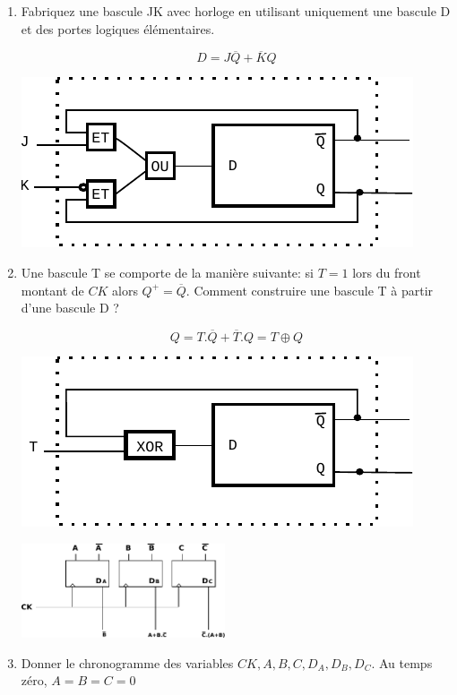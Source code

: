 \documentclass[a4paper,10pt]{exam}
\begin{document}
\begin{enumerate}
  \item Fabriquez une bascule JK avec horloge en utilisant uniquement une
    bascule D et des portes logiques élémentaires.
    \begin{solution}
      $$ D = J\overline{Q} + \overline{K}Q$$

      \includegraphics{TD8-JK}
    \end{solution}

  \item Une bascule T se comporte de la manière suivante: si $T = 1$ lors du
    front montant de $CK$ alors $Q^{+} = \overline{Q}$. Comment construire
    une bascule T à partir d'une bascule D ?

    \begin{solution}
      $$ Q = T.\overline{Q} + \overline{T}.Q = T \oplus Q $$

      \includegraphics{TD8-T}
    \end{solution}
    \begin{center}
      \includegraphics[width=6cm]{TD8-4}
    \end{center}

  \item Donner le chronogramme des variables $CK,A,B,C,D_A,D_B,D_C$. Au temps
    zéro, $A=B=C=0$


\end{enumerate}
\end{document}
